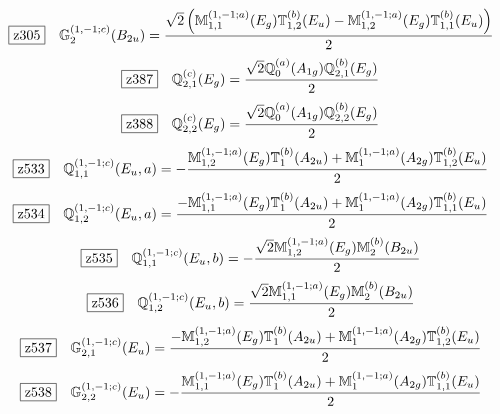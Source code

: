 \documentclass[fleqn,10pt,landscape]{jsarticle}
\begin{document}
\begin{dmath*}
\hspace*{3mm}\fbox{z305}\quad \mathbb{G}_{2}^{(1,-1;c)}(B_{2u})=\frac{\sqrt{2} \left(\mathbb{M}_{1,1}^{(1,-1;a)}(E_{g}) \mathbb{T}_{1,2}^{(b)}(E_{u}) - \mathbb{M}_{1,2}^{(1,-1;a)}(E_{g}) \mathbb{T}_{1,1}^{(b)}(E_{u})\right)}{2}
\end{dmath*}
\begin{dmath*}
\hspace*{3mm}\fbox{z387}\quad \mathbb{Q}_{2,1}^{(c)}(E_{g})=\frac{\sqrt{2} \mathbb{Q}_{0}^{(a)}(A_{1g}) \mathbb{Q}_{2,1}^{(b)}(E_{g})}{2}
\end{dmath*}
\begin{dmath*}
\hspace*{3mm}\fbox{z388}\quad \mathbb{Q}_{2,2}^{(c)}(E_{g})=\frac{\sqrt{2} \mathbb{Q}_{0}^{(a)}(A_{1g}) \mathbb{Q}_{2,2}^{(b)}(E_{g})}{2}
\end{dmath*}
\begin{dmath*}
\hspace*{3mm}\fbox{z533}\quad \mathbb{Q}_{1,1}^{(1,-1;c)}(E_{u},a)=- \frac{\mathbb{M}_{1,2}^{(1,-1;a)}(E_{g}) \mathbb{T}_{1}^{(b)}(A_{2u}) + \mathbb{M}_{1}^{(1,-1;a)}(A_{2g}) \mathbb{T}_{1,2}^{(b)}(E_{u})}{2}
\end{dmath*}
\begin{dmath*}
\hspace*{3mm}\fbox{z534}\quad \mathbb{Q}_{1,2}^{(1,-1;c)}(E_{u},a)=\frac{- \mathbb{M}_{1,1}^{(1,-1;a)}(E_{g}) \mathbb{T}_{1}^{(b)}(A_{2u}) + \mathbb{M}_{1}^{(1,-1;a)}(A_{2g}) \mathbb{T}_{1,1}^{(b)}(E_{u})}{2}
\end{dmath*}
\begin{dmath*}
\hspace*{3mm}\fbox{z535}\quad \mathbb{Q}_{1,1}^{(1,-1;c)}(E_{u},b)=- \frac{\sqrt{2} \mathbb{M}_{1,2}^{(1,-1;a)}(E_{g}) \mathbb{M}_{2}^{(b)}(B_{2u})}{2}
\end{dmath*}
\begin{dmath*}
\hspace*{3mm}\fbox{z536}\quad \mathbb{Q}_{1,2}^{(1,-1;c)}(E_{u},b)=\frac{\sqrt{2} \mathbb{M}_{1,1}^{(1,-1;a)}(E_{g}) \mathbb{M}_{2}^{(b)}(B_{2u})}{2}
\end{dmath*}
\begin{dmath*}
\hspace*{3mm}\fbox{z537}\quad \mathbb{G}_{2,1}^{(1,-1;c)}(E_{u})=\frac{- \mathbb{M}_{1,2}^{(1,-1;a)}(E_{g}) \mathbb{T}_{1}^{(b)}(A_{2u}) + \mathbb{M}_{1}^{(1,-1;a)}(A_{2g}) \mathbb{T}_{1,2}^{(b)}(E_{u})}{2}
\end{dmath*}
\begin{dmath*}
\hspace*{3mm}\fbox{z538}\quad \mathbb{G}_{2,2}^{(1,-1;c)}(E_{u})=- \frac{\mathbb{M}_{1,1}^{(1,-1;a)}(E_{g}) \mathbb{T}_{1}^{(b)}(A_{2u}) + \mathbb{M}_{1}^{(1,-1;a)}(A_{2g}) \mathbb{T}_{1,1}^{(b)}(E_{u})}{2}
\end{dmath*}
\vspace{5mm}
\end{document}
